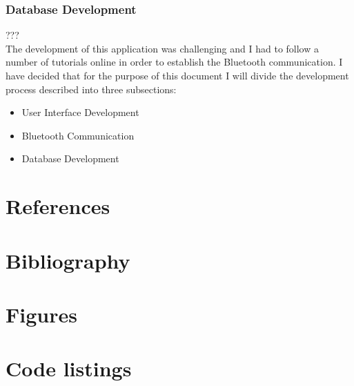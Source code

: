 \documentclass[12pt,a4paper]{article}
\begin{document}
   \subsubsection{Database Development}
   ???\\
               
   The development of this application was challenging and I had to follow a number of tutorials online in order to establish the Bluetooth communication. I have decided that for the purpose of this document I will divide the development process described into three subsections:  
               
   \begin{itemize}
    \item User Interface Development
    \item Bluetooth Communication
    \item Database Development
   \end{itemize}
    
    \section{References}
    \newpage

    \section{Bibliography}
    \newpage

    \section{Figures}
    \listoffigures
    \newpage

    \section{Code listings}
    \lstlistoflistings
    \newpage
\end{document}
